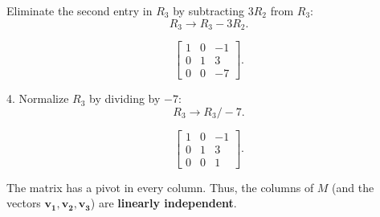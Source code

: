 \documentclass[a4paper,11pt,reqno]{amsart}
\numberwithin{equation}{section}
\begin{document}
\begin{enumerate}
\begin{center}
{{Eliminate the second entry in \( R_3 \) by subtracting \( 3R_2 \) from \( R_3 \):
\[
R_3 \to R_3 - 3R_2.
\]

\[
\begin{bmatrix}
1 & 0 & -1 \\
0 & 1 & 3 \\
0 & 0 & -7
\end{bmatrix}.
\]

4. Normalize \( R_3 \) by dividing by \( -7 \):
\[
R_3 \to R_3 / -7.
\]

\[
\begin{bmatrix}
1 & 0 & -1 \\
0 & 1 & 3 \\
0 & 0 & 1
\end{bmatrix}.
\]


The matrix has a pivot in every column.
Thus, the columns of \( M \) (and the vectors \( \mathbf{v_1}, \mathbf{v_2}, \mathbf{v_3} \)) are \textbf{linearly independent}.
}}
\end{center}
\end{enumerate}
\end{document}

